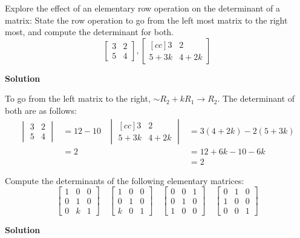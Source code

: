 \documentclass[11pt]{scrartcl}
\theoremstyle{dotlessP}
\theoremstyle{dotlessN}
\begin{document}
\begin{ques}
	Explore the effect of an elementary row operation on the determinant of a matrix: State the row operation to go from the left most matrix to the right most, and compute the determinant for both.
	\[
	\begin{bmatrix}
		3 & 2 \\
		5 & 4
	\end{bmatrix},
	\begin{bmatrix}[cc]
		3 & 2 \\
		5 + 3k & 4 + 2k
	\end{bmatrix}
	\] 
\end{ques}
\textbf{Solution}

To go from the left matrix to the right, $\sim R_2 + kR_1 \to R_2$. The determinant of both are as follows:
\begin{align*}
	\begin{vmatrix}
		3 & 2 \\
		5 & 4
	\end{vmatrix} &= 12 - 10 & 
	\begin{vmatrix}[cc]
		3 & 2 \\
		5 + 3k & 4 + 2k
	\end{vmatrix} 
	&= 3(4+2k) - 2(5+3k) \\
	&= 2 & &= 12 + 6k - 10 - 6k \\
	& & &= 2
\end{align*}
\begin{ques}
	Compute the determinants of the following elementary matrices:
	\[
	\begin{bmatrix}
		1 & 0 & 0 \\
		0 & 1 & 0 \\
		0 & k & 1
	\end{bmatrix} \quad
	\begin{bmatrix}
		1 & 0 & 0 \\
		0 & 1 & 0 \\
		k & 0 & 1
	\end{bmatrix} \quad
	\begin{bmatrix}
		0 & 0 & 1 \\
		0 & 1 & 0 \\
		1 & 0 & 0
	\end{bmatrix} \quad
	\begin{bmatrix}
		0 & 1 & 0 \\
		1 & 0 & 0 \\
		0 & 0 & 1
	\end{bmatrix}
	\] 
\end{ques}
\textbf{Solution}
\end{document}
